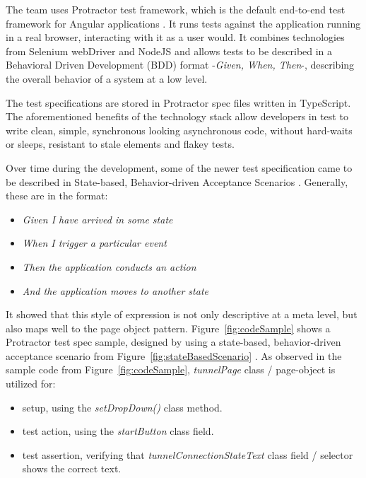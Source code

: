 \documentclass[conference]{IEEEtran}
\begin{document}
	The team uses Protractor test framework, which is the default end-to-end test framework for Angular applications \cite{protractor}.
	It runs tests against the application running in a real browser, interacting with it as a user would.
	It combines technologies from Selenium webDriver and NodeJS and allows tests to be described in a Behavioral Driven Development (BDD) format -\textit{Given, When, Then}-, describing the overall behavior of a system at a low level.
	
	The test specifications are stored in Protractor spec files written in TypeScript. 
	The aforementioned benefits of the technology stack allow developers in test to write clean, simple, synchronous looking asynchronous code, without hard-waits or sleeps, resistant to stale elements and flakey tests.

	Over time during the development, some of the newer test specification came to be described in State-based, Behavior-driven Acceptance Scenarios \cite{stateobjects}. 
	Generally, these are in the format:

	\begin{itemize}
		\item [] \textit{Given I have arrived in some state}
		\item [] \textit{When I trigger a particular event}
		\item [] \textit{Then the application conducts an action}
		\item [] \textit{And the application moves to another state}
	\end{itemize}
	
	It showed that this style of expression is not only descriptive at a meta level, but also maps well to the page object pattern.
	Figure~\ref{fig:codeSample} shows a Protractor test spec sample, designed by using a state-based, behavior-driven acceptance scenario from Figure~\ref{fig:stateBasedScenario} .
	As observed in the sample code from Figure~\ref{fig:codeSample}, \textit{tunnelPage} class / page-object is utilized for:
	
	\begin{itemize}
		\item setup, using the \textit{setDropDown()} class method. 
		\item test action, using the \textit{startButton} class field.
		\item test assertion, verifying that \textit{tunnelConnectionStateText} class field / selector shows the correct text.
	\end{itemize}
\end{document}
